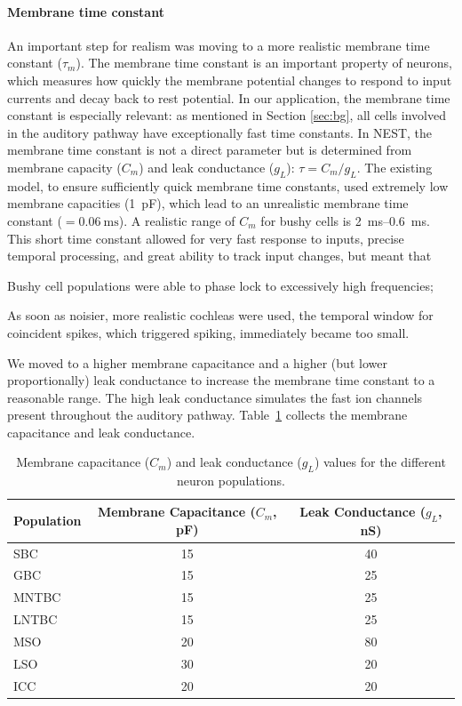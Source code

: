 \documentclass[11pt,a4paper]{article}
\begin{document}
\paragraph{Membrane time constant}
An important step for realism was moving to a more realistic membrane time constant ($\tau_m$). The membrane time constant is an important property of neurons, which measures how quickly the membrane potential changes to respond to input currents and decay back to rest potential. In our application, the membrane time constant is especially relevant: as mentioned in Section \ref{sec:bg}, all cells involved in the auditory pathway have exceptionally fast time constants. In NEST, the membrane time constant is not a direct parameter but is determined from membrane capacity ($C_m$) and leak conductance ($g_L$): $\tau = C_m / g_L$. The existing model, to ensure sufficiently quick membrane time constants, used extremely low membrane capacities (\qty{1}{\pico\farad}), which lead to an unrealistic membrane time constant ($=\qty{0.06}{\milli\second}$). A realistic range \cite{caoVoltagesensitiveConductancesBushy2007} of $C_m$ for bushy cells is \qtyrange{2}{0.6}{\milli\second}. This short time constant allowed for very fast response to inputs, precise temporal processing, and great ability to track input changes, but meant that 
\begin{inlinelist}
    \item Bushy cell populations were able to phase lock to excessively high frequencies;
    \item As soon as noisier, more realistic cochleas were used, the temporal window for coincident spikes, which triggered spiking, immediately became too small.
\end{inlinelist}

We moved to a higher membrane capacitance and a higher (but lower proportionally) leak conductance to increase the membrane time constant to a reasonable range. The high leak conductance simulates the fast ion channels present throughout the auditory pathway. Table~\ref{tab:pop-cap-leak} collects the membrane capacitance and leak conductance.
\begin{table}[H]
    \centering
    \begin{tabular}{|l|c|c|}
        \hline
        \rowcolor{bluePoli!40}
        Population & Membrane Capacitance ($C_m$, pF) & Leak Conductance ($g_L$, nS) \\
        \hline
        SBC & 15 & 40 \\
        \hline
        GBC & 15 & 25 \\
        \hline
        MNTBC & 15 & 25 \\
        \hline
        LNTBC & 15 & 25 \\
        \hline
        MSO & 20 & 80 \\
        \hline
        LSO & 30 & 20 \\
        \hline
        ICC & 20 & 20 \\
        \hline
    \end{tabular}
    \caption{Membrane capacitance ($C_m$) and leak conductance ($g_L$) values for the different neuron populations.}
    \label{tab:pop-cap-leak}
\end{table}
\end{document}
